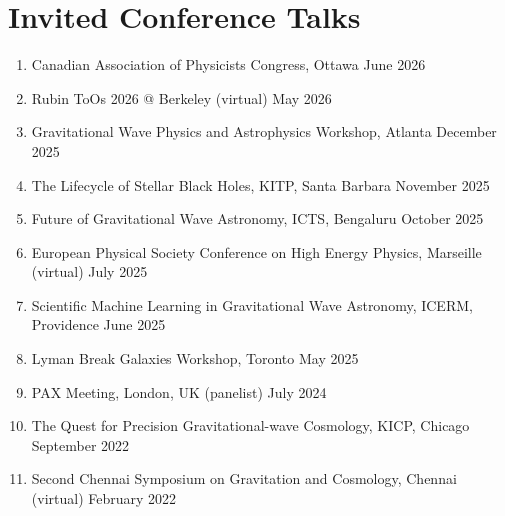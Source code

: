 		\section{Invited Conference Talks}
		\begin{enumerate}[leftmargin=*]
			\item Canadian Association of Physicists Congress, Ottawa \hfill June 2026
			\item Rubin ToOs 2026 @ Berkeley (virtual) \hfill May 2026
            \item Gravitational Wave Physics and Astrophysics Workshop, Atlanta \hfill December 2025
			\item The Lifecycle of Stellar Black Holes, KITP, Santa Barbara \hfill November 2025
			\item Future of Gravitational Wave Astronomy, ICTS, Bengaluru \hfill October 2025
			\item European Physical Society Conference on High Energy Physics, Marseille (virtual) \hfill July 2025
			\item Scientific Machine Learning in Gravitational Wave Astronomy, ICERM, Providence \hfill June 2025
			\item Lyman Break Galaxies Workshop, Toronto \hfill May 2025
			\item PAX Meeting, London, UK (panelist) \hfill July 2024 
			\item The Quest for Precision Gravitational-wave Cosmology, KICP, Chicago \hfill September 2022
			\item {Second Chennai Symposium on Gravitation and Cosmology}, Chennai (virtual) \hfill February 2022

		\end{enumerate}


